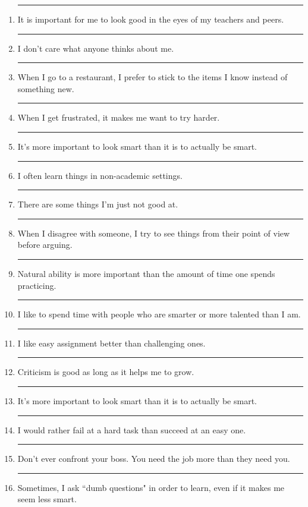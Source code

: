 \documentclass[letterpaper, 10pt]{article}
\begin{document}
\begin{enumerate}
	\item \rule{.5in}{.01in} It is important for me to look good in the eyes of my teachers and peers.
	
	\item \rule{.5in}{.01in} I don't care what anyone thinks about me.
	
	\item \rule{.5in}{.01in} When I go to a restaurant, I prefer to stick to the items I know instead of something new. 
	
	\item \rule{.5in}{.01in} When I get frustrated, it makes me want to try harder.
	
	\item \rule{.5in}{.01in} It's more important to look smart than it is to actually be smart.
	
	\item \rule{.5in}{.01in} I often learn things in non-academic settings.

	\item \rule{.5in}{.01in} There are some things I'm just not good at.
	
	\item \rule{.5in}{.01in} When I disagree with someone, I try to see things from their point of view before arguing.
	
	\item \rule{.5in}{.01in} Natural ability is more important than the amount of time one spends practicing.
	
	\item \rule{.5in}{.01in} I like to spend time with people who are smarter or more talented than I am.
	
	\item \rule{.5in}{.01in} I like easy assignment better than challenging ones.
	
		\item \rule{.5in}{.01in} Criticism is good as long as it helps me to grow.
	
	\item \rule{.5in}{.01in} It's more important to look smart than it is to actually be smart.
	

	\item \rule{.5in}{.01in} I would rather fail at a hard task than succeed at an easy one. 
	
	\item \rule{.5in}{.01in} Don't ever confront your boss.  You need the job more than they need you.
	
	\item \rule{.5in}{.01in} Sometimes, I ask ``dumb questions" in order to learn, even if it makes me seem less smart.

	
\end{enumerate}
 
\end{document}
